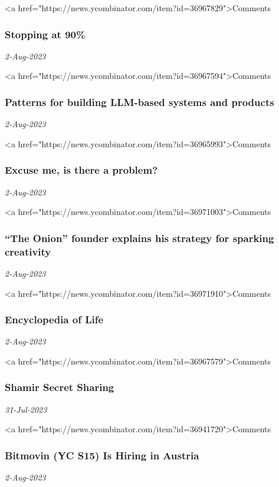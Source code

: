 <a href="https://news.ycombinator.com/item?id=36967829">Comments
\subsubsection{Stopping at 90\% \href{https://austinhenley.com/blog/90percent.html}{}}
\textit{2-Aug-2023}

<a href="https://news.ycombinator.com/item?id=36967594">Comments
\subsubsection{Patterns for building LLM-based systems and products \href{https://eugeneyan.com/writing/llm-patterns/}{}}
\textit{2-Aug-2023}

<a href="https://news.ycombinator.com/item?id=36965993">Comments
\subsubsection{Excuse me, is there a problem? \href{https://longform.asmartbear.com/problem/}{}}
\textit{2-Aug-2023}

<a href="https://news.ycombinator.com/item?id=36971003">Comments
\subsubsection{“The Onion” founder explains his strategy for sparking creativity \href{https://bigthink.com/the-learning-curve/the-onion-founder-strategies-sparking-creativity/}{}}
\textit{2-Aug-2023}

<a href="https://news.ycombinator.com/item?id=36971910">Comments
\subsubsection{Encyclopedia of Life \href{https://eol.org/}{}}
\textit{2-Aug-2023}

<a href="https://news.ycombinator.com/item?id=36967579">Comments
\subsubsection{Shamir Secret Sharing \href{https://max.levch.in/post/724289457144070144/shamir-secret-sharing}{}}
\textit{31-Jul-2023}

<a href="https://news.ycombinator.com/item?id=36941720">Comments
\subsubsection{Bitmovin (YC S15) Is Hiring in Austria \href{https://bitmovin.com/careers/}{}}
\textit{2-Aug-2023}

